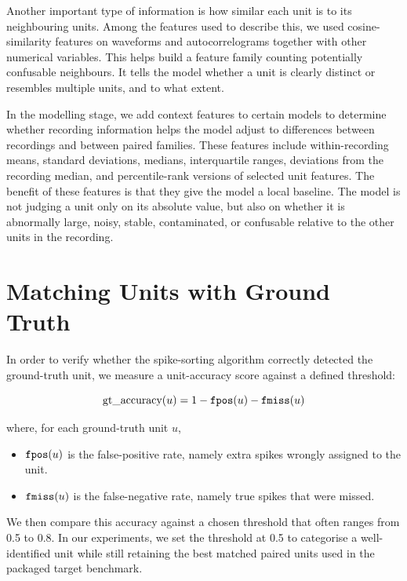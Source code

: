 Another important type of information is how similar each unit is to its neighbouring units. Among the features used to describe this, we used cosine-similarity features on waveforms and autocorrelograms together with other numerical variables. This helps build a feature family counting potentially confusable neighbours. It tells the model whether a unit is clearly distinct or resembles multiple units, and to what extent.

In the modelling stage, we add context features to certain models to determine whether recording information helps the model adjust to differences between recordings and between paired families. These features include within-recording means, standard deviations, medians, interquartile ranges, deviations from the recording median, and percentile-rank versions of selected unit features. The benefit of these features is that they give the model a local baseline. The model is not judging a unit only on its absolute value, but also on whether it is abnormally large, noisy, stable, contaminated, or confusable relative to the other units in the recording.

\section{Matching Units with Ground Truth}

In order to verify whether the spike-sorting algorithm correctly detected the ground-truth unit, we measure a unit-accuracy score against a defined threshold:

\begin{equation}
\text{gt\_accuracy}(u) = 1 - \texttt{fpos}(u) - \texttt{fmiss}(u)
\end{equation}

where, for each ground-truth unit $u$,

\begin{itemize}
    \item $\texttt{fpos}(u)$ is the false-positive rate, namely extra spikes wrongly assigned to the unit.
    \item $\texttt{fmiss}(u)$ is the false-negative rate, namely true spikes that were missed.
\end{itemize}

We then compare this accuracy against a chosen threshold that often ranges from 0.5 to 0.8. In our experiments, we set the threshold at 0.5 to categorise a well-identified unit while still retaining the best matched paired units used in the packaged target benchmark.

